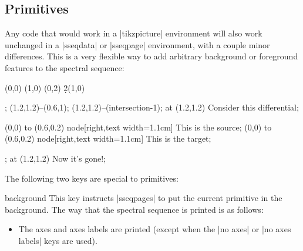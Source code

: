 \documentclass{ltxdoc}
\begin{document}
\begin{sseqdata}[name=ex1,degree={#1}{1-#1}]
\subsection{\tikzname\space Primitives}
Any code that would work in a |tikzpicture| environment will also work unchanged in a |sseqdata| or |sseqpage| environment, with a couple minor differences. This is a very flexible way to add arbitrary background or foreground features to the spectral sequence:
\begin{codeexample}[]
\begin{sseqdata}[name=tikz example,Adams grading,x range={0}{2}, x axis extend end=2em]
\class(0,0)
\class(1,0)
\class(0,2)
\d2(1,0)
\end{sseqdata}
%
\begin{sseqpage}[name=tikz example]
\begin{scope}[blue,font=\tiny]
\node[name path=myellipse, draw, ellipse, inner sep=4pt, scale=0.7, rotate fit=26.5, 
      fit=(sseq{1,0,1}) (sseq{0,2,1})] {}; %
\path[name path=myline](1.2,1.2)--(0.6,1);
\draw[->,name intersections={of=myellipse and myline}] (1.2,1.2)--(intersection-1);
\node[right,text width=1.6cm] at (1.2,1.2) {Consider this differential};
\end{scope}
\end{sseqpage}
%
\begin{sseqpage}[name=tikz example]
\begin{scope}[<-,blue,font=\tiny]
\draw[xshift=1](0,0) to (0.6,0.2) node[right,text width=1.1cm] {This is the source};
\draw[yshift=2](0,0) to (0.6,0.2) node[right,text width=1.1cm] {This is the target};
\end{scope}
\end{sseqpage}
%
\begin{sseqpage}[name=tikz example]
\node[draw,ellipse,blue,inner sep=4pt,scale=0.7,rotate fit=26.5,fit=(sseq{1,0,1}) (sseq{0,2,1})] {};
\node[right,blue,font=\tiny] at (1.2,1.2) {Now it's gone!};
\end{sseqpage}
\end{codeexample}

The following two keys are special to \tikzname\space primitives:
\begin{key}{background}
This key instructs |sseqpages| to put the current \tikzname\space primitive in the background. The way that the spectral sequence is printed is as follows:
\begin{itemize}
\item The axes and axes labels are printed (except when the |no axes| or |no axes labels| keys are used).


\end{itemize}
\end{key}
\end{sseqdata}
\end{document}
